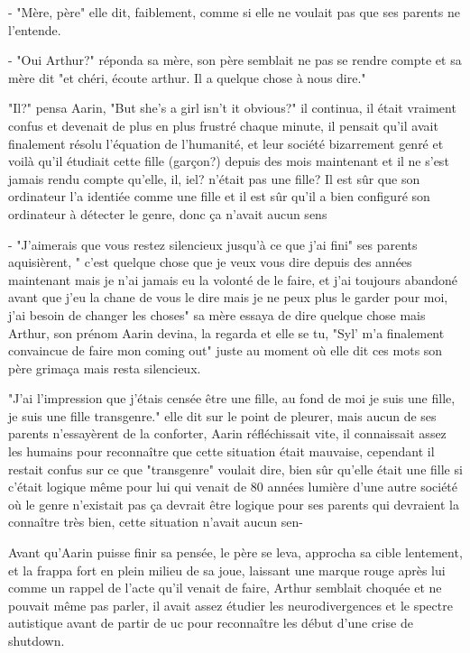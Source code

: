 \documentclass[12pt,colorlinks,a4paper]{book}
\begin{document}
- "Mère, père" elle dit, faiblement, comme si elle ne voulait pas que ses parents ne l'entende.\par
- "Oui Arthur?" réponda sa mère, son père semblait ne pas se rendre compte et sa mère dit "et chéri, écoute arthur. Il 
a quelque chose à nous dire."\par \bigskip

"Il?" pensa Aarin, "But she's a girl isn't it obvious?" il continua, il était vraiment confus et devenait de plus 
en plus frustré chaque minute, il pensait qu'il avait finalement résolu l'équation de l'humanité, et leur 
société bizarrement genré et voilà qu'il étudiait cette fille (garçon?) depuis des mois maintenant et il ne s'est 
jamais rendu compte qu'elle, il, iel? n'était pas une fille? Il est sûr que son ordinateur l'a identiée comme une fille 
et il est sûr qu'il a bien configuré son ordinateur à détecter le genre, donc ça n'avait aucun sens\par 
\bigskip
- "J'aimerais que vous restez silencieux jusqu'à ce que j'ai fini" ses parents aquisièrent, 
" c'est quelque chose que je veux vous dire depuis des années maintenant mais je n'ai jamais eu la volonté de le faire,
et j'ai toujours abandoné avant que j'eu la chane de vous le dire mais je ne peux plus le garder pour moi, j'ai 
besoin de changer les choses" sa mère essaya de dire quelque chose mais Arthur, son prénom Aarin devina, la regarda et elle 
se tu, "Syl' m'a finalement convaincue de faire mon coming out" juste au moment où elle dit ces mots son père grimaça 
mais resta silencieux.\par \bigskip 

"J'ai l'impression que j'étais censée être une fille, au fond de moi je suis une fille, je suis une fille transgenre." elle dit sur le 
point de pleurer, mais aucun de ses parents n'essayèrent de la conforter, Aarin réfléchissait vite, il connaissait assez 
les humains pour reconnaître que cette situation était mauvaise, cependant il restait confus sur ce que "transgenre" voulait 
dire, bien sûr qu'elle était une fille si c'était logique même pour lui qui venait de 80 années lumière d'une autre société 
où le genre n'existait pas ça devrait être logique pour ses parents qui devraient la connaître très bien, cette situation 
n'avait aucun sen-\par 
\bigskip

Avant qu'Aarin puisse finir sa pensée, le père se leva, approcha sa cible lentement, et la frappa fort en plein milieu de 
sa joue, laissant une marque rouge après lui comme un rappel de l'acte qu'il venait de faire, Arthur semblait choquée et 
ne pouvait même pas parler, il avait assez étudier les neurodivergences et le spectre autistique avant de partir de \gls{uc} 
pour reconnaître les début d'une crise de shutdown.\par 
\bigskip 
\end{document}
